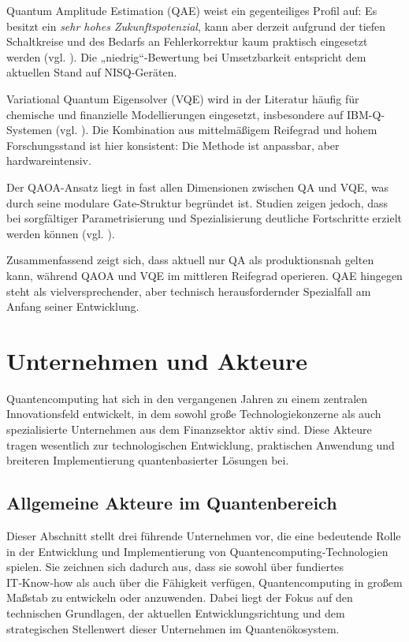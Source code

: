 Quantum Amplitude Estimation (QAE) weist ein gegenteiliges Profil auf: Es besitzt ein \emph{sehr hohes Zukunftspotenzial}, kann aber derzeit aufgrund der tiefen Schaltkreise und des Bedarfs an Fehlerkorrektur kaum praktisch eingesetzt werden (vgl. \cite{bouland_prospects_2020, martin_new_2025}). Die „niedrig“-Bewertung bei Umsetzbarkeit entspricht dem aktuellen Stand auf NISQ-Geräten.

Variational Quantum Eigensolver (VQE) wird in der Literatur häufig für chemische und finanzielle Modellierungen eingesetzt, insbesondere auf IBM-Q-Systemen (vgl. \cite{buonaiuto_best_2023}). Die Kombination aus mittelmäßigem Reifegrad und hohem Forschungsstand ist hier konsistent: Die Methode ist anpassbar, aber hardwareintensiv.

Der QAOA-Ansatz liegt in fast allen Dimensionen zwischen QA und VQE, was durch seine modulare Gate-Struktur begründet ist. Studien zeigen jedoch, dass bei sorgfältiger Parametrisierung und Spezialisierung deutliche Fortschritte erzielt werden können (vgl. \cite{brandhofer_benchmarking_2022}).

Zusammenfassend zeigt sich, dass aktuell nur QA als produktionsnah gelten kann, während QAOA und VQE im mittleren Reifegrad operieren. QAE hingegen steht als vielversprechender, aber technisch herausfordernder Spezialfall am Anfang seiner Entwicklung.



\section{Unternehmen und Akteure}
Quantencomputing hat sich in den vergangenen Jahren zu einem zentralen Innovationsfeld entwickelt, in dem sowohl große Technologiekonzerne als auch spezialisierte Unternehmen aus dem Finanzsektor aktiv sind. Diese Akteure tragen wesentlich zur technologischen Entwicklung, praktischen Anwendung und breiteren Implementierung quantenbasierter Lösungen bei.

\subsection{Allgemeine Akteure im Quantenbereich}
Dieser Abschnitt stellt drei führende Unternehmen vor, die eine bedeutende Rolle in der Entwicklung und Implementierung von Quantencomputing‑Technologien spielen.
Sie zeichnen sich dadurch aus, dass sie sowohl über fundiertes IT‑Know‑how als auch über die Fähigkeit verfügen, Quantencomputing in großem Maßstab zu entwickeln oder anzuwenden.
Dabei liegt der Fokus auf den technischen Grundlagen, der aktuellen Entwicklungsrichtung und dem strategischen Stellenwert dieser Unternehmen im Quantenökosystem.

